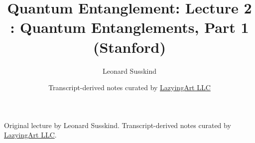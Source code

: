 \documentclass[11pt,oneside]{book}
\begin{document}
\frontmatter
\title{Quantum Entanglement: Lecture 2 : Quantum Entanglements, Part 1 (Stanford)}
\author{Leonard Susskind}
\date{Transcript-derived notes curated by \href{https://lazying.art}{LazyingArt LLC}}
\maketitle
\begin{center}
\small Original lecture by Leonard Susskind. Transcript-derived notes curated by \href{https://lazying.art}{LazyingArt LLC}.
\end{center}
\clearpage
\mainmatter

\end{document}
